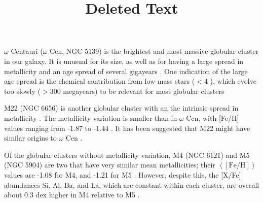 \documentclass[]{article}
\begin{document}
\title{Deleted Text}








$\omega$ Centauri ($\omega$ Cen, NGC 5139) is the brightest and most massive globular cluster in our galaxy. It is unusual for its size, as well as for having a large spread in metallicity \citep{Freeman:1975jf} and an age spread of several gigayears \citep{Smith:2000cb}. One indication of the large age spread is the chemical contribution from low-mass stars ($<4$ \Msun), which evolve too slowly ($>300$ megayears) to be relevant for most globular clusters

M22 (NGC 6656) is another globular cluster with an the intrinsic spread in metallicity \citep{Pilachowski:1982jg,Lehnert:1991ij}. The metallicity variation is smaller than in $\omega$ Cen, with [Fe/H] values ranging from -1.87 to -1.44 \citep{AlvesBrito:2012hy}. It has been suggested that M22 might have similar origins to $\omega$ Cen \citep{DaCosta:2009jl,DaCosta:2011jh}.

Of the globular clusters without metallicity variation, M4 (NGC 6121) and M5 (NGC 5904) are two that have very similar mean metallicities; their $\left<[\text{Fe/H}]\right>$ values are -1.08 for M4, and -1.21 for M5 \citep{Ivans:2001ju}. However, despite this, the [X/Fe] abundances Si, Al, Ba, and La, which are constant within each cluster, are overall about 0.3 dex higher in M4 relative to M5 \citep{Yong:2008in}.
\end{document}
